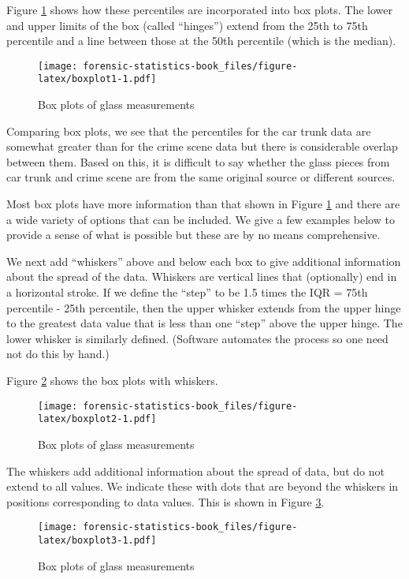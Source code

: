 \documentclass[
]{book}
\begin{document}
Figure \ref{fig:boxplot1} shows how these percentiles
are incorporated into box plots. The lower and upper
limits of the box (called ``hinges'') extend from the
25th to 75th percentile and a line between those at the 50th percentile
(which is the median).

\begin{figure}
\centering
\texttt{[image: forensic-statistics-book\_files/figure-latex/boxplot1-1.pdf]}
\caption{\label{fig:boxplot1}Box plots of glass measurements}
\end{figure}

Comparing box plots, we see that the percentiles for the car trunk data
are somewhat greater than for the crime scene data but there is considerable
overlap between them. Based on this, it is difficult to say whether the
glass pieces from car trunk and crime scene are from the same
original source or different sources.

Most box plots have more information than that shown in Figure \ref{fig:boxplot1}
and there are a wide variety of options that can be included. We give a few
examples below to provide a sense of what is possible but these are by no means
comprehensive.

We next add ``whiskers'' above and below each box to give additional information
about the spread of the data. Whiskers are vertical lines that (optionally)
end in a horizontal stroke. If we define the ``step'' to be 1.5 times the
IQR = 75th percentile - 25th percentile, then the upper whisker extends
from the upper hinge to the greatest data value that is less than one ``step''
above the upper hinge. The lower whisker is similarly defined. (Software
automates the process so one need not do this by hand.)

Figure \ref{fig:boxplot2} shows the box plots with whiskers.

\begin{figure}
\centering
\texttt{[image: forensic-statistics-book\_files/figure-latex/boxplot2-1.pdf]}
\caption{\label{fig:boxplot2}Box plots of glass measurements}
\end{figure}

The whiskers add additional information about the spread of data, but do
not extend to all values. We indicate these with dots that are beyond
the whiskers in positions corresponding to data values. This is shown in
Figure \ref{fig:boxplot3}.

\begin{figure}
\centering
\texttt{[image: forensic-statistics-book\_files/figure-latex/boxplot3-1.pdf]}
\caption{\label{fig:boxplot3}Box plots of glass measurements}
\end{figure}
\end{document}
